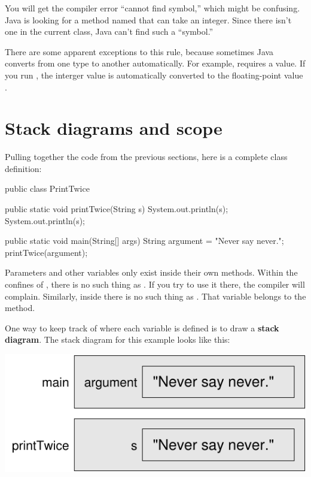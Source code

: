 You will get the compiler error ``cannot find symbol,'' which might be confusing.
Java is looking for a method named  that can take an integer.
Since there isn't one in the current class, Java can't find such a ``symbol.''

There are some apparent exceptions to this rule, because sometimes Java converts from one type to another automatically.
For example,  requires a  value.
If you run , the interger value  is automatically converted to the floating-point value .



\section{Stack diagrams and scope}
\label{stack}


Pulling together the code from the previous sections, here is a complete
class definition:

\begin{code}
public class PrintTwice {

    public static void printTwice(String s) {
        System.out.println(s);
        System.out.println(s);
    }

    public static void main(String[] args) {
        String argument = "Never say never.";
        printTwice(argument);
    }
}
\end{code}

Parameters and other variables only exist inside their own methods.
Within the confines of , there is no such thing as .
If you try to use it there, the compiler will complain.
Similarly, inside  there is no such thing as .
That variable belongs to the  method.

One way to keep track of where each variable is defined is to draw a {\bf stack diagram}.
The stack diagram for this example looks like this:

\begin{center}
\includegraphics{stack.pdf}
\end{center}

